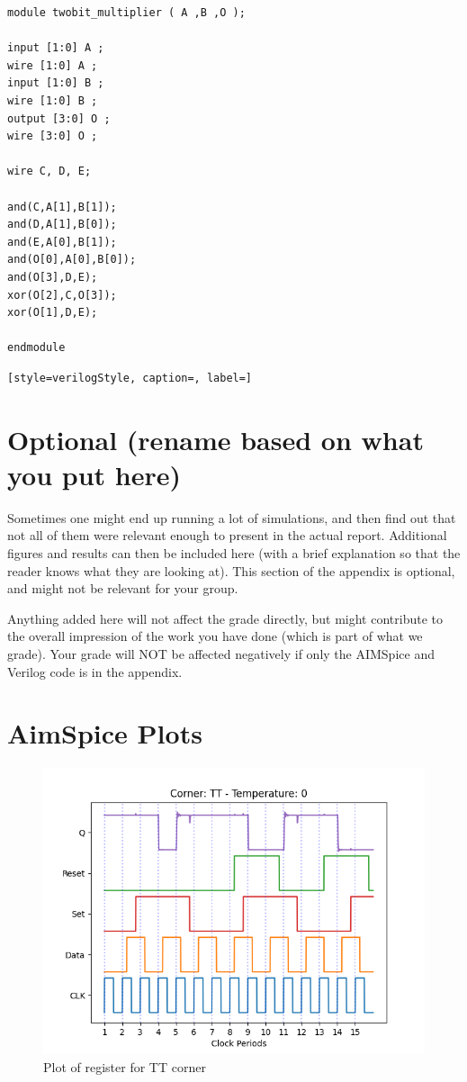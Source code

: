 \begin{lstlisting}[style=verilogStyle, caption=2-bit Multiplier in Verilog, label=verilog_multiplier]
module twobit_multiplier ( A ,B ,O );

input [1:0] A ;
wire [1:0] A ;
input [1:0] B ;
wire [1:0] B ;
output [3:0] O ;
wire [3:0] O ;

wire C, D, E;

and(C,A[1],B[1]);
and(D,A[1],B[0]);
and(E,A[0],B[1]);
and(O[0],A[0],B[0]);
and(O[3],D,E);
xor(O[2],C,O[3]);
xor(O[1],D,E);

endmodule
\end{lstlisting}

\begin{lstlisting}[style=verilogStyle, caption=, label=]
\end{lstlisting}

\section{Optional (rename based on what you put here)}
Sometimes one might end up running a lot of simulations, and then find out that not all of them were relevant enough to present in the actual report. Additional figures and results can then be included here (with a brief explanation so that the reader knows what they are looking at). This section of the appendix is optional, and might not be relevant for your group. 

Anything added here will not affect the grade directly, but might contribute to the overall impression of the work you have done (which is part of what we grade). Your grade will NOT be affected negatively if only the AIMSpice and Verilog code is in the appendix.

\section{AimSpice Plots}
\label{appendix:aimspicePlots}

\begin{figure}[H]
    \centering
    \includegraphics[width=\textwidth]{Figures/Aimspice_Plots/TT_0.png}
    \caption{Plot of register for TT corner}
    \label{fig:TT0}
\end{figure}

